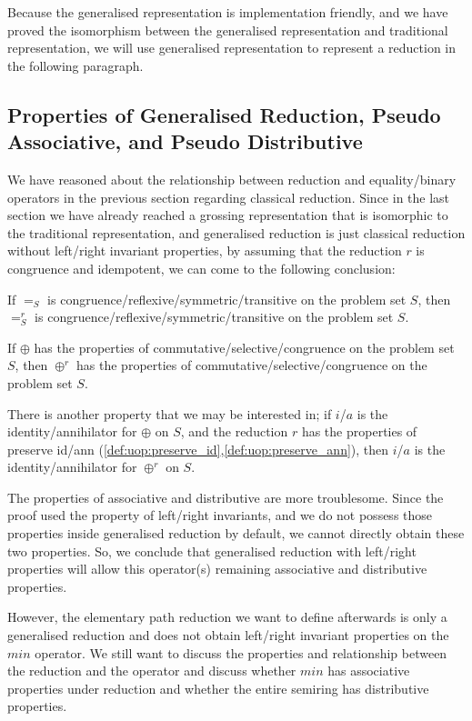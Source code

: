 \documentclass[a4paper,12pt,twoside,openright]{report}
\begin{document}
Because the generalised representation is implementation friendly, and we have proved the isomorphism between the generalised representation and traditional representation, we will use generalised representation to represent a reduction in the following paragraph.

\subsection{Properties of Generalised Reduction, Pseudo Associative, and Pseudo Distributive}
We have reasoned about the relationship between reduction and equality/binary operators in the previous section regarding classical reduction. 
Since in the last section we have already reached a grossing representation that is isomorphic to the traditional representation, and generalised reduction is just classical reduction without left/right invariant properties, by assuming that the reduction $r$ is congruence and idempotent, we can come to the following conclusion:

If $=_S$ is congruence/reflexive/symmetric/transitive on the problem set $S$, then $=^r_S$ is congruence/reflexive/symmetric/transitive on the problem set $S$.

If $\oplus$ has the properties of commutative/selective/congruence on the problem set $S$, then $\oplus^r$ has the properties of commutative/selective/congruence on the problem set $S$.

There is another property that we may be interested in; if $i$/$a$ is the identity/annihilator for $\oplus$ on $S$, and the reduction $r$ has the properties of preserve id/ann (\ref{def:uop:preserve_id},\ref{def:uop:preserve_ann}), then $i$/$a$ is the identity/annihilator for $\oplus^r$ on $S$.

The properties of associative and distributive are more troublesome. Since the proof used the property of left/right invariants, and we do not possess those properties inside generalised reduction by default, we cannot directly obtain these two properties. So, we conclude that generalised reduction with left/right properties will allow this operator(s) remaining associative and distributive properties.

However, the elementary path reduction we want to define afterwards is only a generalised reduction and does not obtain left/right invariant properties on the $min$ operator. We still want to discuss the properties and relationship between the reduction and the operator and discuss whether $min$ has associative properties under reduction and whether the entire semiring has distributive properties.
\end{document}
